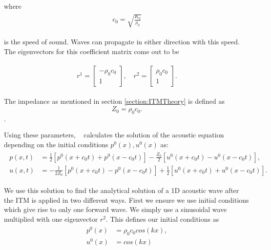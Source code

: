 where 
\begin{align}
    \begin{split}
        c_0 = \sqrt{\frac{K_0}{\rho_0}}
    \end{split}
\end{align}

is the speed of sound. Waves can propagate in either direction with this speed. The eigenvectors for this coefficient matrix come out to be

\begin{align}
    \begin{split}
        r^1 = \begin{bmatrix}
            -\rho_0 c_0 \\
            1
        \end{bmatrix}, \quad
        r^2 = \begin{bmatrix}
            \rho_0 c_0 \\
            1
        \end{bmatrix}.
    \end{split}
\end{align}

The impedance as mentioned in section \ref{section:ITMTheory} is defined as
\begin{equation}
    Z_0 = \rho_0 c_0.
\end{equation}.

Using these parameters, ~\parencite[Sec. 2.8]{leveque_2002} calculates the solution of the acoustic equation depending on the initial conditions $p^0(x), u^0(x)$ as:
\begin{align}
    \begin{split}
        p(x,t) &= \frac{1}{2}\left[p^0\left(x + c_0t\right) + p^0\left(x - c_0t\right)\right] - \frac{Z_0}{2}\left[u^0\left(x+c_0t\right) - u^0\left(x-c_0t\right)\right], \\
        u(x,t) &= -\frac{1}{2Z_0}\left[p^0\left(x+c_0t\right) - p^0\left(x-c_0t\right)\right] + \frac{1}{2}\left[u^0\left(x+c_0t\right) + u^0\left(x-c_0t\right)\right] .
    \end{split}
    \label{eq:solutionacoustic}
\end{align}

We use this solution to find the analytical solution of a 1D acoustic wave after the \ac{ITM} is applied in two different ways. First we ensure we use initial conditions which give rise to only one forward wave. We simply use a sinusoidal wave multiplied with one eigenvector $r^2$.
This defines our initial conditions as
\begin{align}
    \begin{split}
        p^0\left(x\right) &= \rho_0c_0cos\left(kx\right), \\
        u^0\left(x\right) &= cos\left(kx\right)
    \end{split}
    \label{eq:initialconditions}
\end{align}

